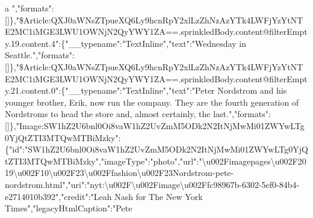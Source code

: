 a
","formats":{[}{]}\},"\$Article:QXJ0aWNsZTpueXQ6Ly9hcnRpY2xlLzZhNzAzYTk4LWFjYzYtNTE2MC1iMGE3LWU1OWNjN2QyYWY1ZA==.sprinkledBody.content@filterEmpty.19.content.4":\{"\_\_typename":"TextInline","text":"Wednesday
in
Seattle.","formats":{[}{]}\},"\$Article:QXJ0aWNsZTpueXQ6Ly9hcnRpY2xlLzZhNzAzYTk4LWFjYzYtNTE2MC1iMGE3LWU1OWNjN2QyYWY1ZA==.sprinkledBody.content@filterEmpty.21.content.0":\{"\_\_typename":"TextInline","text":"Peter
Nordstrom and his younger brother, Erik, now run the company. They are
the fourth generation of Nordstroms to head the store and, almost
certainly, the
last.","formats":{[}{]}\},"Image:SW1hZ2U6bnl0Oi8vaW1hZ2UvZmM5ODk2N2ItNjMwMi01ZWYwLTg0YjQtZTI3MTQwMTBiMzky":\{"id":"SW1hZ2U6bnl0Oi8vaW1hZ2UvZmM5ODk2N2ItNjMwMi01ZWYwLTg0YjQtZTI3MTQwMTBiMzky","imageType":"photo","url":"\textbackslash{}u002Fimagepages\textbackslash{}u002F2019\textbackslash{}u002F10\textbackslash{}u002F23\textbackslash{}u002Ffashion\textbackslash{}u002F23Nordstrom-pete-nordstrom.html","uri":"nyt:\textbackslash{}u002F\textbackslash{}u002Fimage\textbackslash{}u002Ffc98967b-6302-5ef0-84b4-e2714010b392","credit":"Leah
Nash for The New York Times","legacyHtmlCaption":"Pete
